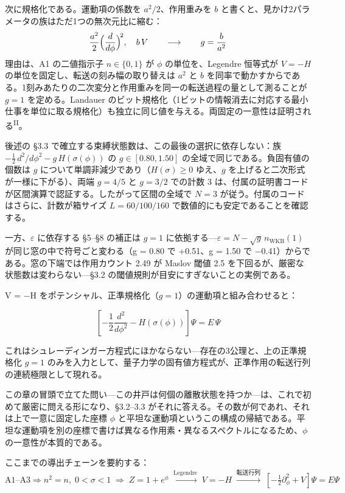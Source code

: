 \documentclass[fontsize=11pt,paper=a4,lualatex]{jlreq}
\newcommand{\PII}{\textsuperscript{\textup{II}}}
\begin{document}
次に規格化である。運動項の係数を $a^2/2$、作用重みを $b$ と書くと、見かけ2パラメータの族はただ1つの無次元比に縮む：
\[\frac{a^2}{2}\Bigl(\frac{d}{d\phi}\Bigr)^{\!2},\quad b\,V \qquad\longrightarrow\qquad g = \frac{b}{a^2}\]
理由は、A1 の二値指示子 $n \in \{0,1\}$ が $\phi$ の単位を、Legendre 恒等式が $V = -H$ の単位を固定し、転送の刻み幅の取り替えは $a^2$ と $b$ を同率で動かすからである。1刻みあたりの二次変分と作用重みを同一の転送過程の量として測ることが $g = 1$ を定める。Landauer のビット規格化（1ビットの情報消去に対応する最小仕事を単位に取る規格化）も独立に同じ値を与える。両固定の一意性は証明される\PII{}。

後述の §3.3 で確立する束縛状態数は、この最後の選択に依存しない：族 $-\tfrac{1}{2}\,d^2\!/d\phi^2 - g\,H(\sigma(\phi))$ の $g \in [0.80, 1.50]$ の全域で同じである。負固有値の個数は $g$ について単調非減少であり（$H(\sigma) \ge 0$ ゆえ、$g$ を上げると二次形式が一様に下がる）、両端 $g = 4/5$ と $g = 3/2$ での計数 3 は、付属の証明書コードが区間演算で認証する。したがって区間の全域で $N = 3$ が従う。付属のコードはさらに、計数が箱サイズ $L = 60/100/160$ で数値的にも安定であることを確認する。

一方、$\varepsilon$ に依存する §5–§8 の補正は $g = 1$ に依拠する---$\varepsilon = N - \sqrt{g}\,n_\mathrm{WKB}(1)$ が同じ窓の中で符号ごと変わる（g = 0.80 で +0.51、g = 1.50 で −0.41）からである。窓の下端では作用カウント 2.49 が Maslov 閾値 2.5 を下回るが、厳密な状態数は変わらない---§3.2 の閾値規則が目安にすぎないことの実例である。

V = −H をポテンシャル、正準規格化（$g = 1$）の運動項と組み合わせると：

\[\left[-\frac{1}{2}\frac{d^2}{d\phi^2} - H(\sigma(\phi))\right]\Psi = E\,\Psi\]

これはシュレーディンガー方程式にほかならない---存在の3公理と、上の正準規格化 $g = 1$ のみを入力として、量子力学の固有値方程式が、正準作用の転送行列の連続極限として現れる。

この章の冒頭で立てた問い---この井戸は何個の離散状態を持つか---は、これで初めて厳密に問える形になり、§3.2--3.3 がそれに答える。その数が何であれ、それは上で一意に固定した座標 $\phi$ と平坦な運動項というこの構成の帰結である。平坦な運動項を別の座標で書けば異なる作用素・異なるスペクトルになるため、$\phi$ の一意性が本質的である。

ここまでの導出チェーンを要約する：
\[
  \text{A1--A3} \Rightarrow n^2{=}n,\; 0{<}\sigma{<}1 \;\Rightarrow\; Z = 1{+}e^{\phi}
  \;\xrightarrow{\text{Legendre}}\; V = -H
  \;\xrightarrow{\text{転送行列}}\;
  \left[-\tfrac{1}{2}\partial_\phi^2 + V\right]\Psi = E\Psi
\]
\end{document}

